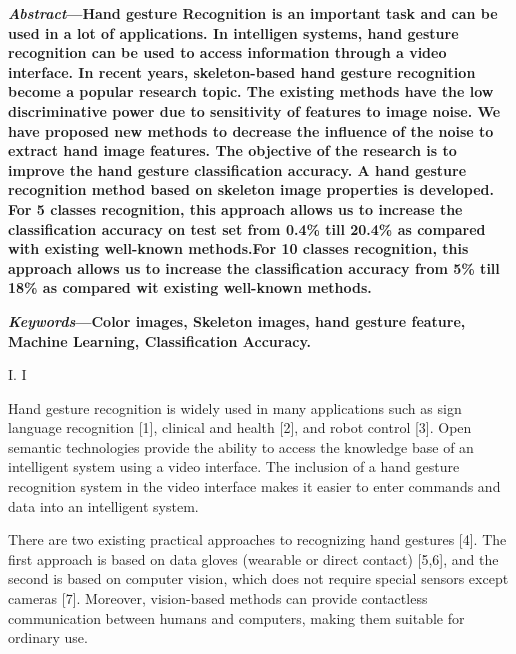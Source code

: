 \documentclass{article}
\begin{document}
\begin{multicols}{2}

\raggedright
\begin{minipage}[t]{0.47\textwidth}

\vspace{1.3cm} \hspace{0.2cm} \fontsize{8}{7}\selectfont \textbf{\textit{Abstract}—Hand gesture Recognition is an important task and can be used in a lot of applications. In intelligen systems, hand gesture recognition can be used to access information through a video interface. In recent years, skeleton-based hand gesture recognition become a popular research topic. The existing methods have the low discriminative power due to sensitivity of features to image noise. We have proposed new methods to decrease the influence of the noise to extract hand image features. The objective of the research is to improve the hand gesture classification accuracy. A hand gesture recognition method based on skeleton image properties is developed. For 5 classes recognition, this approach allows us to increase the classification accuracy on test set from 0.4\% till 20.4\% as compared with existing well-known methods.For 10 classes recognition, this approach allows us to increase the classification accuracy from 5\% till 18\% as compared wit existing well-known methods.}

\hspace{0.2cm} \textbf{\textit{Keywords}—Color images, Skeleton images, hand gesture feature, Machine Learning, Classification Accuracy.}

\begin{center}
\fontsize{9}{7}\selectfont \textsc{I. I}
\end{center}


\fontsize{10}{7}\selectfont \hspace{0.2cm}Hand gesture recognition is widely used in many applications such as sign language recognition [1], clinical and health [2], and robot control [3]. Open semantic technologies provide the ability to access the knowledge base of an intelligent system using a video interface. The inclusion of a hand gesture recognition system in the video interface makes it easier to enter commands and data into an intelligent system.

\hspace{0.2cm}There are two existing practical approaches to recognizing hand gestures [4]. The first approach is based on data gloves (wearable or direct contact) [5,6], and the second is based on computer vision, which does not require special sensors except cameras [7]. Moreover, vision-based methods can provide contactless communication between humans and computers, making them suitable for ordinary use.


\end{minipage}
\end{multicols}
\end{document}

